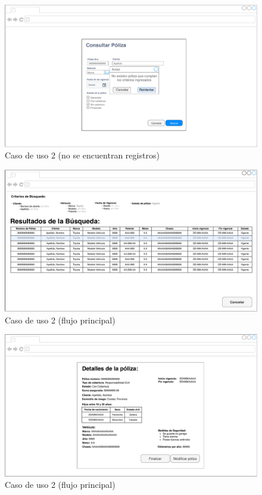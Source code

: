 \documentclass[12pt]{article}
\begin{document}
\vfill
\begin{figure}[h!]
\includegraphics[width=\textwidth]{CU2/CU-025.pdf}
\caption{Caso de uso 2 (no se encuentran registros)}
\end{figure}
\vfill


\vfill
\begin{figure}[h!]
\includegraphics[width=\textwidth]{CU2/CU-024.pdf}
\caption{Caso de uso 2 (flujo principal)}
\end{figure}
\vfill


\vfill
\begin{figure}[h!]
\includegraphics[width=\textwidth]{CU2/CU-026.pdf}
\caption{Caso de uso 2 (flujo principal)}
\end{figure}
\vfill
\end{document}
